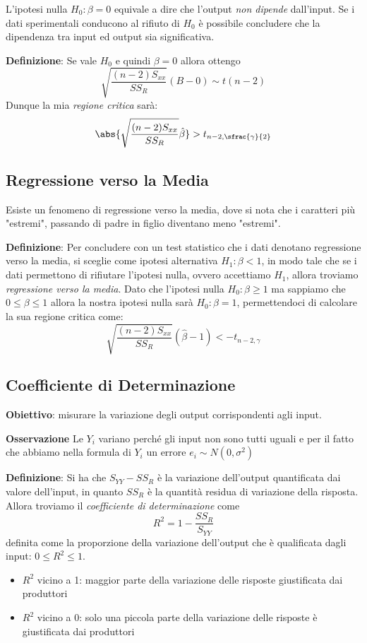 L'ipotesi nulla $H_0: \beta = 0$ equivale a dire che l'output \textit{non dipende} dall'input. Se i dati sperimentali conducono al rifiuto di $H_0$ è possibile concludere che la dipendenza tra input ed output sia significativa. \n

\ind \textbf{Definizione}: Se vale $H_0$ e quindi $\beta=0$ allora ottengo $$\sqrt{\dfrac{(n-2)S_{xx}}{SS_R}} (B - 0) \sim t(n-2)$$ Dunque la mia \textit{regione critica} sarà: $$ \abs{\sqrt{\dfrac{(n-2)S_{xx}}{SS_R}}\hat{\beta}} > t_{n-2, \sfrac{\gamma}{2}}$$

\subsection{Regressione verso la Media}

Esiste un fenomeno di regressione verso la media, dove si nota che i caratteri più "estremi", passando di padre in figlio diventano meno "estremi". \n

\ind \textbf{Definizione}: Per concludere con un test statistico che i dati denotano regressione verso la media, si sceglie come ipotesi alternativa $H_1: \beta < 1$, in modo tale che se i dati permettono di rifiutare l'ipotesi nulla, ovvero accettiamo $H_1$, allora troviamo \textit{regressione verso la media}. Dato che l'ipotesi nulla $H_0: \beta \geq 1$ ma sappiamo che $0 \leq \beta \leq 1$ allora la nostra ipotesi nulla sarà $H_0 : \beta = 1$, permettendoci di calcolare la sua regione critica come:  $$ \sqrt{\dfrac{(n-2)S_{xx}}{SS_R}}(\hat{\beta}-1) < - t_{n-2, \gamma}$$

\subsection{Coefficiente di Determinazione}

\textbf{Obiettivo}: misurare la variazione degli output corrispondenti agli input. \n

\ind \textbf{Osservazione} Le $Y_i$ variano perché gli input non sono tutti uguali e per il fatto che abbiamo nella formula di $Y_i$ un errore $e_i \sim N(0, \sigma^2)$ \n

\ind \textbf{Definizione}: Si ha che $S_{YY} - SS_R$ è la variazione dell'output quantificata dai valore dell'input, in quanto $SS_R$ è la quantità residua di variazione della risposta. Allora troviamo il \textit{coefficiente di determinazione} come $$R^2 = 1 - \dfrac{SS_R}{S_{YY}}$$ definita come la proporzione della variazione dell'output che è qualificata dagli input: $0 \leq R^2 \leq 1$.
\begin{itemize}
    \item $R^2$ vicino a 1: maggior parte della variazione delle risposte giustificata dai produttori
    \item $R^2$ vicino a 0: solo una piccola parte della variazione delle risposte è giustificata dai produttori
\end{itemize}
\newpage
